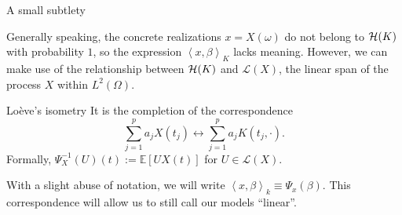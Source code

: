 \documentclass[10pt, english, professionalfonts]{beamer}
\newcommand\maroon[1]{\color{mLightBrown}#1\color{mDarkTeal}}
\newcommand{\E}{\mathbb{E}}
\newcommand{\Hcal}{\ensuremath\mathcal{H}}
\newcommand\dotprod[2]{\left\langle #1, #2 \right\rangle}
\begin{document}
%
%
%

\begin{frame}{A small subtlety}

  Generally speaking, the concrete realizations \(x=X(\omega)\) \maroon{do not belong to \(\Hcal(K)\) with probability \(1\)}, so the expression \(\dotprod{x}{\beta}_K\) lacks meaning. However, we can make use of the relationship between \(\Hcal(K)\) and \(\mathcal L(X)\), the linear span of the process \(X\) within \(L^2(\Omega)\).


  \vspace{1em}
  \begin{block}{Loève's isometry}
    It is the completion of the correspondence
    \[
\sum_{j=1}^p a_j X(t_j) \longleftrightarrow \sum_{j=1}^p a_j K(t_j, \cdot).
    \]
    Formally, \(\Psi^{-1}_X(U)(t) := \E[U X(t)]\) for \(U \in \mathcal L(X)\).
  \end{block}
  With a slight abuse of notation, we will write \maroon{\(\dotprod{x}{\beta}_k \equiv \Psi_x(\beta)\)}. This correspondence will allow us to still call our models ``linear''.
\end{frame}
\end{document}
